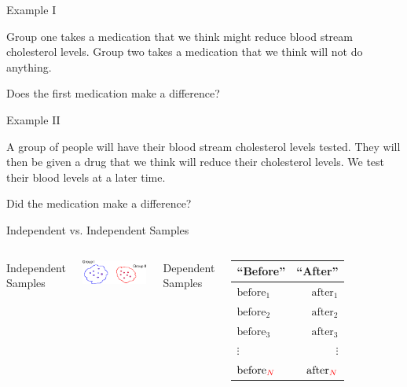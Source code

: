 \begin{frame}{Example I}

  Group one takes a medication that we think might reduce blood stream
  cholesterol levels. Group two takes a medication that we think will
  not do anything.

  \vfill

  Does the first medication make a difference?

  \vfill

  
\end{frame}

\begin{frame}{Example II}

  A group of people will have their blood stream cholesterol levels
  tested. They will then be given a drug that we think will reduce
  their cholesterol levels. We test their blood levels at a later
  time.

  \vfill

  Did the medication make a difference?

  \vfill

  
\end{frame}

\begin{frame}{Independent vs. Independent Samples}

  \begin{columns}[T]
    Independent Samples

    \includegraphics[width=5cm]{img/independentSamples}

    \vfill

    Dependent Samples

    \begin{tabular}{l@{$\Rightarrow$}r}
      ``Before'' & ``After'' \\ \hline
      $\textrm{before}_1$  & $\textrm{after}_1$ \\
      $\textrm{before}_2$  & $\textrm{after}_2$ \\
      $\textrm{before}_3$  & $\textrm{after}_3$ \\
      $\vdots$ & $\vdots$ \\
      $\textrm{before}_{{\color{red}N}}$ & $\textrm{after}_{{\color{red}N}}$  \\
    \end{tabular}


    \vfill

  \end{columns}

  
\end{frame}

